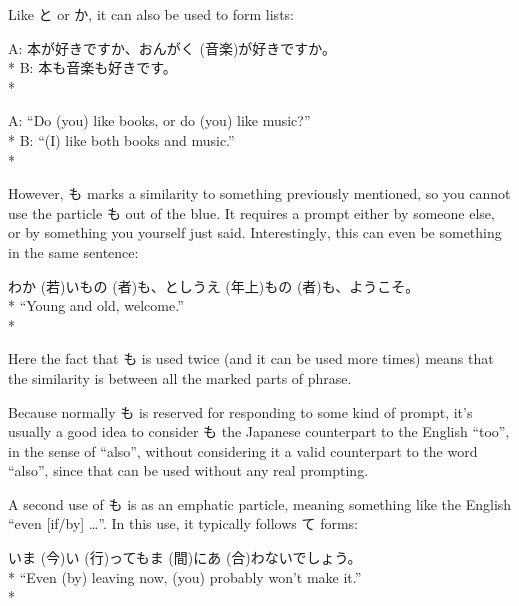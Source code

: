 \documentclass[11pt, b5paper, twoside, openright, onecolumn]{book}
\makeatletter
\newcommand*{\rubystack}[2]{{\relscale{0.5}%
  \begin{tabular}[b]{@{}c@{}}%
    {#1}\\%
   {\textscale{2}{#2}}%
  \end{tabular}}%
}
\DeclareRobustCommand*{\ruby}[2]{%
  \mbox{%
    \setlength{\parskip}{0ex}%
    \BeginAccSupp{method=pdfstringdef,ActualText={#1}}%
      \rubystack{\phantom{#2}}{#1}%
      \llap{%
        \rubystack{#2}{\phantom{#1}}%
      }%
    \EndAccSupp{}%
  }%
}
\renewcommand*{\ruby}[2]{#2 (#1)}%
\newenvironment{exampleblock}{
\setlength{\parindent}{0.6in}
\begin{minipage}[t]{\dimexpr\textwidth-\parindent}}
{\end{minipage}}
\makeatother
\begin{document}
Like と or か‚ it can also be used to form lists:

\vspace{0.4cm}
\begin{exampleblock}
A: 本が好きですか、\ruby{音楽}{おんがく}が好きですか。 \\* 
B: 本も音楽も好きです。 \\* 
\end{exampleblock}
\vspace{0.2cm}

\begin{exampleblock}
A: “Do (you) like books‚ or do (you) like music?” \\* 
B: “(I) like both books and music.” \\* 
\end{exampleblock}
\vspace{0.2cm}

However‚ も marks a similarity to something previously mentioned‚ so you cannot use the particle も out of the blue. It requires a prompt either by someone else‚ or by something you yourself just said. Interestingly‚ this can even be something in the same sentence:

\vspace{0.4cm}
\begin{exampleblock}
\ruby{若}{わか}い\ruby{者}{もの}も、\ruby{年上}{としうえ}\ruby{者}{もの}も、ようこそ。 \\* 
“Young and old‚ welcome.” \\* 
\end{exampleblock}
\vspace{0.2cm}

Here the fact that も is used twice (and it can be used more times) means that the similarity is between all the marked parts of phrase.

Because normally も is reserved for responding to some kind of prompt‚ it’s usually a good idea to consider も the Japanese counterpart to the English “too”‚ in the sense of “also”‚ without considering it a valid counterpart to the word “also”‚ since that can be used without any real prompting.

A second use of も is as an emphatic  particle‚ meaning something like the English “even [if/by] …”. In this use‚ it typically follows て forms:

\vspace{0.4cm}
\begin{exampleblock}
\ruby{今}{いま}\ruby{行}{い}っても\ruby{間}{ま}に\ruby{合}{あ}わないでしょう。 \\* 
“Even (by) leaving now‚ (you) probably won’t make it.” \\* 
\end{exampleblock}
\vspace{0.2cm}
\end{document}
